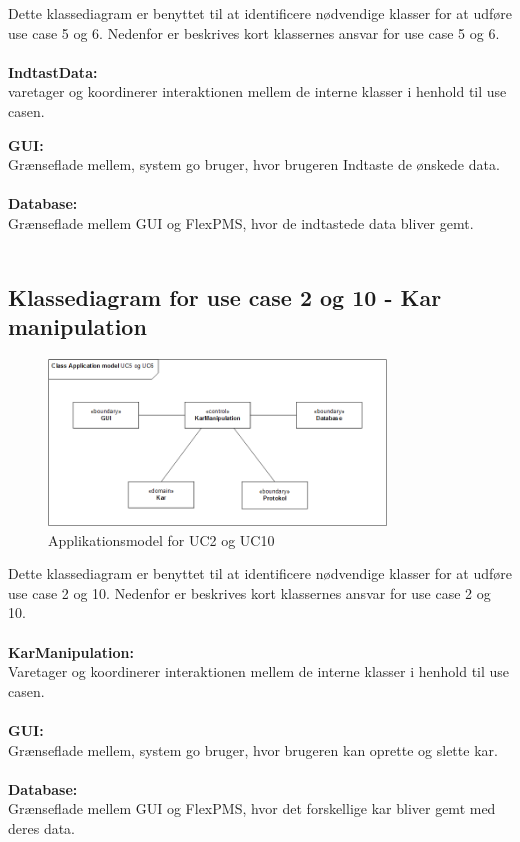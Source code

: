 Dette klassediagram er benyttet til at identificere nødvendige klasser for at udføre use case 5 og 6.
Nedenfor er beskrives kort klassernes ansvar for use case 5 og 6.
\\\\
\textbf{IndtastData:}\\
varetager og koordinerer interaktionen mellem de interne klasser i henhold til use casen.

\textbf{GUI:}\\
Grænseflade mellem, system go bruger, hvor brugeren Indtaste de ønskede data. 
\\\\

\textbf{Database:}\\
Grænseflade mellem GUI og FlexPMS, hvor de  indtastede data bliver gemt. 
\\\\

\subsection{Klassediagram for use case 2 og 10 - Kar manipulation}

\begin{figure}[H]
    \centering
    \includegraphics[width=0.8\textwidth]{Systemarkitektur/KlasseDiagrammer/2+10_KarManipulate.PNG}
    \caption{Applikationsmodel for UC2 og UC10}
    \label{fig:app_uc210}
\end{figure}

Dette klassediagram er benyttet til at identificere nødvendige klasser for at udføre use case 2 og 10.
Nedenfor er beskrives kort klassernes ansvar for use case 2 og 10.
\\\\
\textbf{KarManipulation:}\\
Varetager og koordinerer interaktionen mellem de interne klasser i henhold til use casen.
\\\\
\textbf{GUI:}\\
Grænseflade mellem, system go bruger, hvor brugeren kan oprette og slette kar. 
\\\\

\textbf{Database:}\\
Grænseflade mellem GUI og FlexPMS, hvor det forskellige kar bliver gemt med deres data. 
\\\\